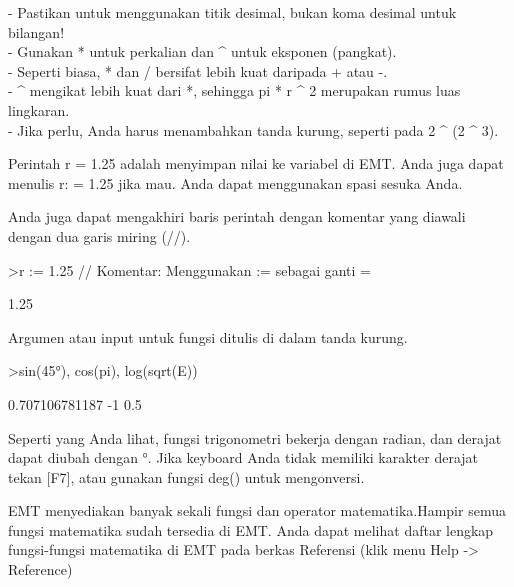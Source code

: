 \documentclass{article}
\begin{document}
\begin{eulernotebook}
\begin{eulercomment}
\begin{eulercomment}
\begin{eulercomment}
- Pastikan untuk menggunakan titik desimal, bukan koma desimal untuk
bilangan!\\
- Gunakan * untuk perkalian dan \textasciicircum{} untuk eksponen (pangkat).\\
- Seperti biasa, * dan / bersifat lebih kuat daripada + atau -.\\
- \textasciicircum{} mengikat lebih kuat dari *, sehingga pi * r \textasciicircum{} 2 merupakan rumus
luas lingkaran.\\
- Jika perlu, Anda harus menambahkan tanda kurung, seperti pada 2 \textasciicircum{} (2
\textasciicircum{} 3).

Perintah r = 1.25 adalah menyimpan nilai ke variabel di EMT. Anda juga
dapat menulis r: = 1.25 jika mau. Anda dapat menggunakan spasi sesuka
Anda.

Anda juga dapat mengakhiri baris perintah dengan komentar yang diawali
dengan dua garis miring (//).
\end{eulercomment}
\begin{eulerprompt}
>r := 1.25 // Komentar: Menggunakan  := sebagai ganti =
\end{eulerprompt}
\begin{euleroutput}
  1.25
\end{euleroutput}
\begin{eulercomment}
Argumen atau input untuk fungsi ditulis di dalam tanda kurung.
\end{eulercomment}
\begin{eulerprompt}
>sin(45°), cos(pi), log(sqrt(E))
\end{eulerprompt}
\begin{euleroutput}
  0.707106781187
  -1
  0.5
\end{euleroutput}
\begin{eulercomment}
Seperti yang Anda lihat, fungsi trigonometri bekerja dengan radian, dan derajat
dapat diubah dengan °. Jika keyboard Anda tidak memiliki karakter derajat tekan
[F7], atau gunakan fungsi deg() untuk mengonversi.

EMT menyediakan banyak sekali fungsi dan operator matematika.Hampir semua fungsi
matematika sudah tersedia di EMT. Anda dapat melihat daftar lengkap fungsi-fungsi
matematika di EMT pada berkas Referensi (klik menu Help -\textgreater{} Reference)


\end{eulercomment}
\end{eulercomment}
\end{eulercomment}
\end{eulernotebook}
\end{document}
